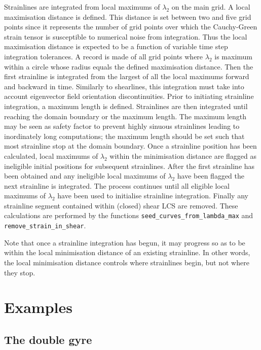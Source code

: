 \documentclass{article}
\begin{document}
Strainlines are integrated from local maximums of $\lambda_2$ on the main grid. A local maximisation distance is defined. This distance is set between two and five grid points since it represents the number of grid points over which the Cauchy-Green strain tensor is susceptible to numerical noise from integration. Thus the local maximisation distance is expected to be a function of variable time step integration tolerances. A record is made of all grid points where $\lambda_2$ is maximum within a circle whose radius equals the defined maximisation distance. Then the first strainline is integrated from the largest of all the local maximums forward and backward in time. Similarly to shearlines, this integration must take into account eigenvector field orientation discontinuities. Prior to initiating strainline integration, a maximum length is defined. Strainlines are then integrated until reaching the domain boundary or the maximum length. The maximum length may be seen as safety factor to prevent highly sinuous strainlines leading to inordinately long computations; the maximum length should be set such that most strainline stop at the domain boundary. Once a strainline position has been calculated, local maximums of $\lambda_2$ within the minimisation distance are flagged as ineligible initial positions for subsequent strainlines. After the first strainline has been obtained and any ineligible local maximums of $\lambda_2$ have been flagged the next strainline is integrated. The process continues until all eligible local maximums of $\lambda_2$ have been used to initialise strainline integration. Finally any strainline segment contained within (closed) shear LCS are removed. These calculations are performed by the functions \texttt{seed\_curves\_from\_lambda\_max} and \texttt{remove\_strain\_in\_shear}.

Note that once a strainline integration has begun, it may progress so as to be within the local minimisation distance of an existing strainline. In other words, the local minimisation distance controls where strainlines begin, but not where they stop.

\section{Examples}

\subsection{The double gyre}
\end{document}
